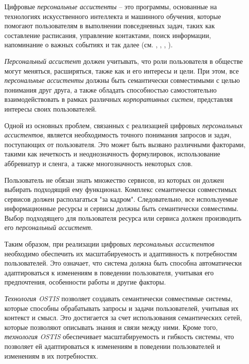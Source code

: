 Цифровые \textit{персональные ассистенты} – это программы, основанные на технологиях искусственного интеллекта и машинного обучения, которые помогают пользователям в выполнении повседневных задач, таких как составление расписания, управление контактами, поиск информации, напоминание о важных событиях и так далее (см. , , , ).

\textit{Персональный ассистент} должен учитывать, что роли пользователя в обществе могут меняться, расширяться, также как и его интересы и цели. 
При этом, все \textit{персональные ассистенты} должны быть семантически совместимыми с целью понимания друг друга, а также обладать способностью самостоятельно взаимодействовать в рамках различных \textit{корпоративных систем}, представляя интересы своих пользователей.

Одной из основных проблем, связанных с реализацией цифровых \textit{персональных ассистентов}, является необходимость точного понимания запросов и задач, поступающих от пользователя. Это может быть вызвано различными факторами, такими как нечеткость и неоднозначность формулировок, использование аббревиатур и сленга, а также многозначность некоторых слов.

Пользователь не обязан знать множество сервисов, из которых он должен выбирать подходящий ему функционал. Комплекс семантически совместимых сервисов должен располагаться "за кадром"{}. Следовательно, все используемые информационные ресурсы и сервисы должны быть семантически совместимы. Выбор подходящего для пользователя ресурса или сервиса должен производить его \textit{персональный ассистент}.

Таким образом, при реализации цифровых \textit{персональных ассистентов} необходимо обеспечить их масштабируемость и адаптивность к потребностям пользователей. Это означает, что система должна быть способна автоматически адаптироваться к изменениям в поведении пользователя, учитывая его предпочтения, особенности работы и другие факторы.

\textit{Технология OSTIS} позволяет создавать семантически совместимые системы, которые способны обрабатывать запросы и задачи пользователей, учитывая их контекст и смысл. Это достигается за счет использования семантических сетей, которые позволяют описывать знания и связи между ними. Кроме того, \textit{технология OSTIS} обеспечивает масштабируемость и гибкость системы, что позволяет ей адаптироваться к изменениям в поведении пользователей и изменениям в их потребностях.

